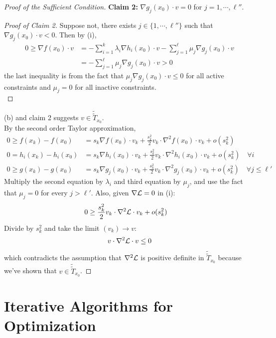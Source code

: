 \documentclass{article}
\newcommand{\ttilde}[1]{\tilde{\tilde{#1}}}
\begin{document}
\begin{proof}[Proof of the Sufficient Condition]
		\textbf{Claim 2:} $\nabla g_j(x_0) \cdot v = 0$ for $j = 1, \cdots, \ell''$.
		\begin{proof}[Proof of Claim 2]
			Suppose not, there exists $j \in \{1, \cdots, \ell''\}$ such that $\nabla g_j(x_0) \cdot v < 0$. Then by (i),
			\begin{align}
				0 \geq \nabla f(x_0) \cdot v &= - \sum_{i=1}^k \lambda_i \nabla h_i(x_0) \cdot v - \sum_{j=1}^{\ell} \mu_j \nabla g_j(x_0) \cdot v \\
				&= - \sum_{j=1}^{\ell} \mu_j \nabla g_j(x_0) \cdot v > 0
			\end{align}
			the last inequality is from the fact that $\mu_j \nabla g_j (x_0) \cdot v \leq 0$ for all active constraints and $\mu_j = 0$ for all inactive constraints. \\
		\end{proof}
		(b) and claim 2 suggests $v \in \ttilde{T}_{x_0}$. \\
		By the second order Taylor approximation,
		\begin{align}
			0 \geq f(x_k) - f(x_0) &= s_k \nabla f(x_0)\cdot v_k + \frac{s_k^2}{2} v_k \cdot \nabla^2 f(x_0) \cdot v_k + o(s_k^2) \\
			0 = h_i(x_k) - h_i(x_0) &= s_k \nabla h_i(x_0)\cdot v_k + \frac{s_k^2}{2} v_k \cdot \nabla^2 h_i(x_0) \cdot v_k + o(s_k^2)\quad \forall i\\
			0 \geq g(x_k) - g(x_0) &= s_k \nabla g_j(x_0)\cdot v_k + \frac{s_k^2}{2} v_k \cdot \nabla^2 g_j(x_0) \cdot v_k + o(s_k^2)\quad \forall j \leq \ell'
		\end{align}
		Multiply the second equation by $\lambda_i$ and third equation by $\mu_j$, and use the fact that $\mu_j = 0$ for every $j > \ell'$. Also, given $\nabla \mathcal{{L}} = 0$ in (i): 
		\begin{align}
			0 &\geq \frac{s_k^2}{2} v_k \cdot \nabla^2 \mathcal{{L}} \cdot v_k + o(s_k^2)
		\end{align}
		Divide by $s_k^2$ and take the limit $(v_k) \to v$:
		\begin{align}
			v\cdot \nabla^2 \mathcal{{L}}\cdot v \leq 0
		\end{align}
		which contradicts the assumption that $\nabla^2 \mathcal{{L}}$ is positive definite in $\ttilde{T}_{x_0}$ because we've shown that $v \in \ttilde{T}_{x_0}$.
	\end{proof}
	\section{Iterative Algorithms for Optimization}
\end{document}
